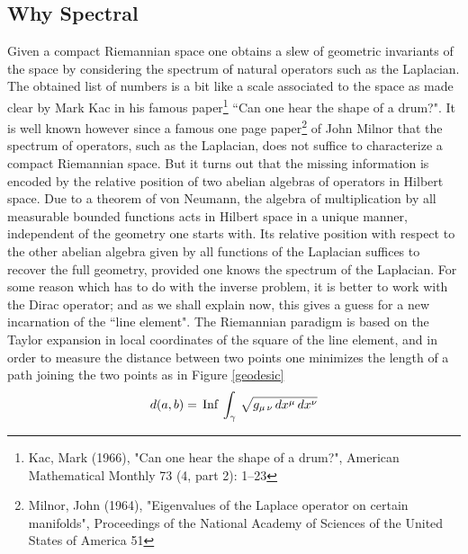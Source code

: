 \documentclass[12pt]{article}
\begin{document}
\subsection{Why Spectral}

Given a compact Riemannian space one obtains a slew of geometric invariants of the space by considering the spectrum of natural operators such as the Laplacian. 
The obtained list of numbers is a bit like a scale associated to the space  as made clear by Mark Kac in his famous paper\footnote{Kac, Mark (1966), "Can one hear the shape of a drum?", American Mathematical Monthly 73 (4, part 2): 1--23} ``Can one hear the shape of a drum?".
It is well known however since a famous one page paper\footnote{Milnor, John (1964), "Eigenvalues of the Laplace operator on certain manifolds", Proceedings of the National Academy of Sciences of the United States of America 51} of John Milnor that the spectrum
of operators, such as the Laplacian, does not suffice to characterize a compact
Riemannian space. But it turns out that the missing information is encoded by
the relative position of two abelian algebras of operators in Hilbert space.
Due to a theorem of von Neumann, the algebra of multiplication by all measurable
bounded functions acts in Hilbert space in a unique manner, independent of the
geometry one starts with. Its relative position with respect to the other
abelian algebra given by all functions of the Laplacian suffices to recover the
full geometry, provided one knows the spectrum of the Laplacian. For some
reason which has to do with the inverse problem, it is better to work with the
Dirac operator; and as we shall explain now, this gives a guess for a new incarnation of the ``line element". The Riemannian paradigm is based on the Taylor expansion in local coordinates
of the square of the line element, and in order to measure the distance between
two points one minimizes the length of a path joining the two points as in Figure \ref{geodesic}
\begin{equation}\label{riemann distance}
d(a,b)=\,{\rm Inf}\,\int_\gamma\,\sqrt{g_{\mu\,\nu}\,dx^\mu\,dx^\nu}	
\end{equation}
\end{document}
